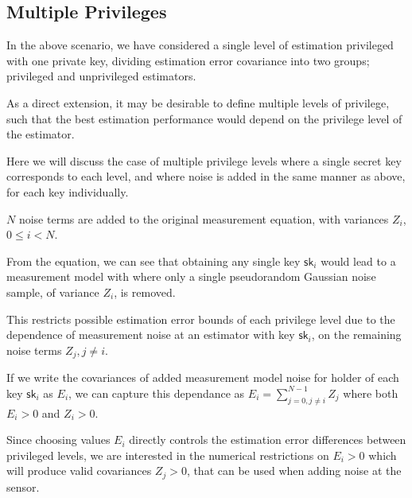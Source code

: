 \documentclass[conference]{IEEEtran}
\theoremstyle{definition}
\theoremstyle{definition}
\theoremstyle{remark}
\begin{document}
% 
% 

\subsection{Multiple Privileges}
In the above scenario, we have considered a single level of estimation privileged with one private key, dividing estimation error covariance into two groups; privileged and unprivileged estimators.

As a direct extension, it may be desirable to define multiple levels of privilege, such that the best estimation performance would depend on the privilege level of the estimator.

Here we will discuss the case of multiple privilege levels where a single secret key corresponds to each level, and where noise is added in the same manner as above, for each key individually.

$N$ noise terms are added to the original measurement equation, with variances $Z_i$, $0 \leq i < N$.

From the equation, we can see that obtaining any single key $\mathsf{sk}_i$ would lead to a measurement model with where only a single pseudorandom Gaussian noise sample, of variance $Z_i$, is removed.

This restricts possible estimation error bounds of each privilege level due to the dependence of measurement noise at an estimator with key $\mathsf{sk}_i$, on the remaining noise terms $Z_j,j \neq i$.

If we write the covariances of added measurement model noise for holder of each key $\mathsf{sk}_i$ as $E_i$, we can capture this dependance as $E_i=\sum^{N-1}_{j=0,j \neq i}Z_j$ where both $E_i>0$ and $Z_i>0$.

Since choosing values $E_i$ directly controls the estimation error differences between privileged levels, we are interested in the numerical restrictions on $E_i>0$ which will produce valid covariances $Z_j>0$, that can be used when adding noise at the sensor.
\end{document}

